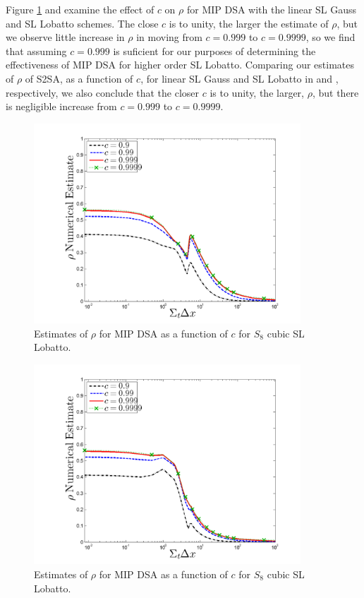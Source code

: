 Figure \ref{fig:mip_gauss_as_fun_c} and  examine the effect of $c$ on $\rho$ for MIP DSA with the linear SL Gauss and SL Lobatto schemes.
The close $c$ is to unity, the larger the estimate of $\rho$, but we observe little increase in $\rho$ in moving from $c=0.999$ to $c=0.9999$, so we find that assuming $c=0.999$ is suficient for our purposes of determining the effectiveness of MIP DSA for higher order SL Lobatto.  Comparing our estimates of $\rho$ of S2SA, as a function of $c$, for linear SL Gauss and SL Lobatto in  and , respectively, we also conclude that the closer $c$ is to unity, the larger, $\rho$, but there is negligible increase from $c=0.999$ to $c=0.9999$.
\begin{figure}[!hbp]
\centering
\includegraphics[width=10cm]{chapter4_acceleration/Constant_XS_c_comparions_MIP_Gauss.png}
\caption{Estimates of $\rho$ for MIP DSA as a function of $c$  for  $S_8$  cubic SL Lobatto.}
\label{fig:mip_gauss_as_fun_c}
\end{figure}
\vfill{}
\pagebreak
\begin{figure}[!htp]
\centering
\includegraphics[width=10cm]{chapter4_acceleration/Constant_XS_c_comparions_MIP_Lobatto.png}
\caption{Estimates of $\rho$ for MIP DSA as a function of $c$  for  $S_8$  cubic SL Lobatto.}
\label{fig:mip_lobatto_as_fun_c}
\end{figure}
